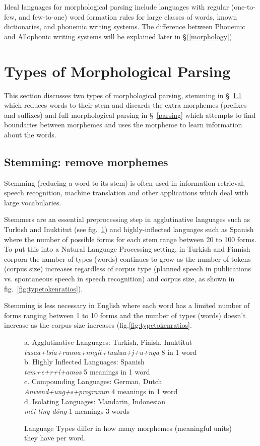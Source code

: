 \documentclass[runningheads,a4paper]{llncs}
\begin{document}
Ideal languages for morphological parsing include languages with  regular (one-to-few, and few-to-one) word formation rules for large classes of words, known dictionaries, and phonemic writing systems. The difference between Phonemic and Allophonic writing systems will be explained later in \S (\ref{morphology}).

\section{Types of Morphological Parsing}
\label{typesof}
This section discusses two types of morphological parsing, stemming in \S~\ref{stemming} which reduces words to their stem and discards the extra morphemes (prefixes and suffixes) and full morphological parsing in \S~\ref{parsing} which attempts to find boundaries between morphemes and uses the morpheme to learn information about the words. 
\subsection{Stemming: remove morphemes}
\label{stemming}
Stemming (reducing a word to its stem) is often used in information retrieval, speech recognition, machine translation and other applications which deal with large vocabularies. 

Stemmers are an essential preprocessing step in agglutinative languages such as Turkish and Inuktitut (see fig.~\ref{fig:languagetypes}) and highly-inflected languages such as Spanish where the number of possible forms for each stem range between 20 to 100 forms. To put this into a Natural Language Processing setting, in Turkish and Finnish corpora the number of types (words) continues to grow as the number of tokens (corpus size) increases regardless of corpus type (planned speech in publications vs. spontaneous speech in speech recognition) and corpus size, as shown in fig.~\ref{fig:typetokenratios}). 

Stemming is less necessary in English where each word has a limited number of forms  ranging between 1 to 10 forms and the number of types (words) doesn't increase as the corpus size increases (fig.\ref{fig:typetokenratios}. 

\begin{figure}[thb]
	a. Agglutinative Languages: Turkish, Finish, Inuktitut\\
	\indent \textit{tusaa+tsia+runna+nngit+tualuu+j+u+nga} 8 in 1 word\\
	b. Highly Inflected Languages:	Spanish\\
	\textit{tem+e+r+\'{i}+amos} 5 meanings in 1 word \\
	c. Compounding Languages: German, Dutch \\
	\textit{Anwend+ung+s+programm} 4 meanings in 1 word \\
	d. Isolating Languages:	Mandarin, Indonesian\\
	\textit{m\'{e}i ting d\v{o}ng} 1 meanings 3 words
	\caption{Language Types differ in how many morphemes (meaningful units) they have per word.  }
	\label{fig:languagetypes}
\end{figure}
\end{document}
